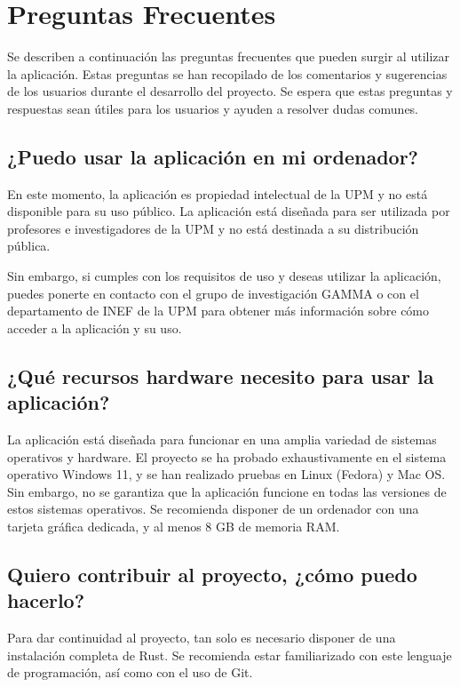 \chapter{Preguntas Frecuentes}

\noindent Se describen a continuación las preguntas frecuentes que pueden surgir al utilizar la aplicación. Estas preguntas se han recopilado de los comentarios y sugerencias de los usuarios durante el desarrollo del proyecto. Se espera que estas preguntas y respuestas sean útiles para los usuarios y ayuden a resolver dudas comunes.


\section{¿Puedo usar la aplicación en mi ordenador?}

En este momento, la aplicación es propiedad intelectual de la \ac{UPM} y no está disponible para su uso público. La aplicación está diseñada para ser utilizada por profesores e investigadores de la \ac{UPM} y no está destinada a su distribución pública.

Sin embargo, si cumples con los requisitos de uso y deseas utilizar la aplicación, puedes ponerte en contacto con el grupo de investigación \ac{GAMMA} o con el departamento de \ac{INEF} de la \ac{UPM} para obtener más información sobre cómo acceder a la aplicación y su uso.

\section{¿Qué recursos hardware necesito para usar la aplicación?}

La aplicación está diseñada para funcionar en una amplia variedad de sistemas operativos y hardware. El proyecto se ha probado exhaustivamente en el sistema operativo Windows 11, y se han realizado pruebas en Linux (Fedora) y Mac OS. Sin embargo, no se garantiza que la aplicación funcione en todas las versiones de estos sistemas operativos. Se recomienda disponer de un ordenador con una tarjeta gráfica dedicada, y al menos 8 GB de memoria RAM.

\section{Quiero contribuir al proyecto, ¿cómo puedo hacerlo?}

Para dar continuidad al proyecto, tan solo es necesario disponer de una instalación completa de Rust. Se recomienda estar familiarizado con este lenguaje de programación, así como con el uso de Git.

